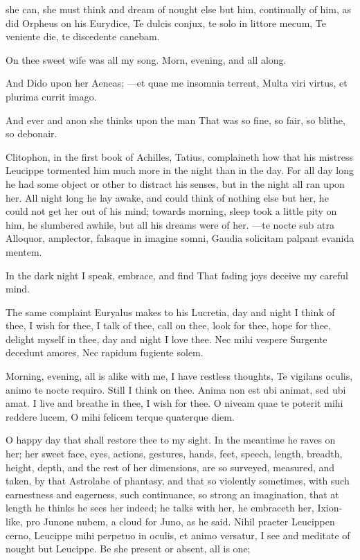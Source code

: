 {she can, she must think and dream of nought else but him, continually
of him, as did Orpheus on his Eurydice,
Te dulcis conjux, te solo in littore mecum,
Te veniente die, te discedente canebam.

On thee sweet wife was all my song.
Morn, evening, and all along.

And Dido upon her Aeneas;
---et quae me insomnia terrent,
Multa viri virtus, et plurima currit imago.

And ever and anon she thinks upon the man
That was so fine, so fair, so blithe, so debonair.

Clitophon, in the first book of Achilles, Tatius, complaineth how that
his mistress Leucippe tormented him much more in the night than in the
day. For all day long he had some object or other to distract his
senses, but in the night all ran upon her. All night long he lay 
awake, and could think of nothing else but her, he could not get her
out of his mind; towards morning, sleep took a little pity on him, he
slumbered awhile, but all his dreams were of her.
---te nocte sub atra
Alloquor, amplector, falsaque in imagine somni,
Gaudia solicitam palpant evanida mentem.

In the dark night I speak, embrace, and find
That fading joys deceive my careful mind.

The same complaint Euryalus makes to his Lucretia, day and night
I think of thee, I wish for thee, I talk of thee, call on thee, look
for thee, hope for thee, delight myself in thee, day and night I love
thee.
Nec mihi vespere
Surgente decedunt amores,
Nec rapidum fugiente solem.

Morning, evening, all is alike with me, I have restless thoughts,
 Te vigilans oculis, animo te nocte requiro. Still I think on
thee. Anima non est ubi animat, sed ubi amat. I live and breathe in
thee, I wish for thee.
O niveam quae te poterit mihi reddere lucem,
O mihi felicem terque quaterque diem.

O happy day that shall restore thee to my sight. In the meantime he
raves on her; her sweet face, eyes, actions, gestures, hands, feet,
speech, length, breadth, height, depth, and the rest of her dimensions,
are so surveyed, measured, and taken, by that Astrolabe of phantasy,
and that so violently sometimes, with such earnestness and eagerness,
such continuance, so strong an imagination, that at length he thinks he
sees her indeed; he talks with her, he embraceth her, Ixion-like, pro
Junone nubem, a cloud for Juno, as he said. Nihil praeter Leucippen
cerno, Leucippe mihi perpetuo in oculis, et animo versatur, I see and
meditate of nought but Leucippe. Be she present or absent, all is one;

}
